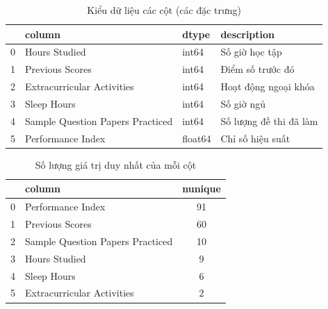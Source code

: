 \begin{table}[H]
	\centering
	\begin{tabular}{|c|l|l|l|}
		\hline
		\textbf{} & \textbf{column}                  & \textbf{dtype} & \textbf{description}   \\ \hline
		0         & Hours Studied                    & int64          & Số giờ học tập         \\
		1         & Previous Scores                  & int64          & Điểm số trước đó       \\
		2         & Extracurricular Activities       & int64          & Hoạt động ngoại khóa   \\
		3         & Sleep Hours                      & int64          & Số giờ ngủ             \\
		4         & Sample Question Papers Practiced & int64          & Số lượng đề thi đã làm \\
		5         & Performance Index                & float64        & Chỉ số hiệu suất       \\ \hline
	\end{tabular}
	\caption{Kiểu dữ liệu các cột (các đặc trưng)}
\end{table}

\begin{table}[H]
	\centering
	\begin{tabular}{|c|l|c|}
		\hline
		\textbf{} & \textbf{column}                  & \textbf{nunique} \\ \hline
		0         & Performance Index                & 91               \\
		1         & Previous Scores                  & 60               \\
		2         & Sample Question Papers Practiced & 10               \\
		3         & Hours Studied                    & 9                \\
		4         & Sleep Hours                      & 6                \\
		5         & Extracurricular Activities       & 2                \\ \hline
	\end{tabular}
	\caption{Số lượng giá trị duy nhất của mỗi cột}
\end{table}

